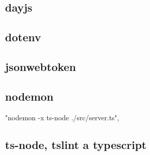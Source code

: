 \subsection*{dayjs}

\subsection*{dotenv}

\subsection*{jsonwebtoken}

\subsection*{nodemon}
"nodemon -x ts-node ./src/server.ts",

\subsection*{ts-node, tslint a typescript}